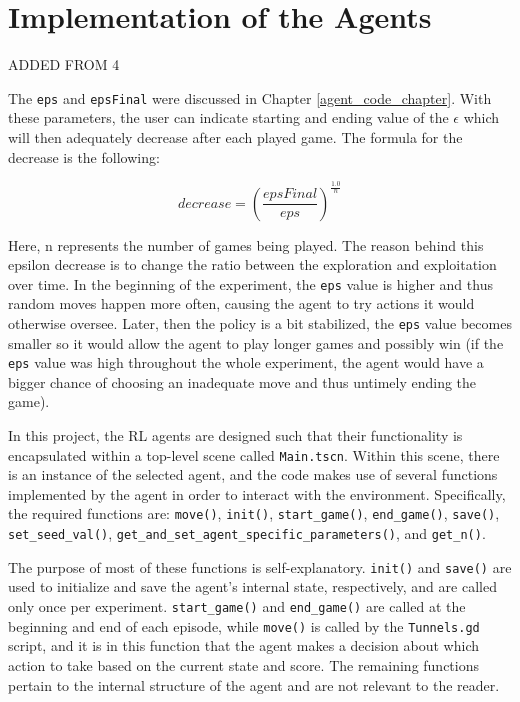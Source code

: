 \chapter{Implementation of the Agents}
ADDED FROM 4

The \texttt{eps} and \texttt{epsFinal} were discussed in Chapter \ref{agent_code_chapter}. With these parameters, the user can indicate starting and ending value of the $\epsilon$ which will then adequately decrease after each played game. The formula for the decrease is the following:

$$decrease = (\frac{epsFinal}{eps})^{\frac{1.0}{n}}$$

Here, n represents the number of games being played. The reason behind this epsilon decrease is to change the ratio between the exploration and exploitation over time. In the beginning of the experiment, the \texttt{eps} value is higher and thus random moves happen more often, causing the agent to try actions it would otherwise oversee. Later, then the policy is a bit stabilized, the \texttt{eps} value becomes smaller so it would allow the agent to play longer games and possibly win (if the \texttt{eps} value was high throughout the whole experiment, the agent would have a bigger chance of choosing an inadequate move and thus untimely ending the game).

\label{implOfAgents}
In this project, the RL agents are designed such that their functionality is encapsulated within a top-level scene called \texttt{Main.tscn}. Within this scene, there is an instance of the selected agent, and the code makes use of several functions implemented by the agent in order to interact with the environment. Specifically, the required functions are: \texttt{move()}, \texttt{init()}, \texttt{start\_game()}, \texttt{end\_game()}, \texttt{save()}, \texttt{set\_seed\_val()}, \texttt{get\_and\_set\_agent\_specific\_parameters()}, and \texttt{get\_n()}.

The purpose of most of these functions is self-explanatory. \texttt{init()} and \texttt{save()} are used to initialize and save the agent's internal state, respectively, and are called only once per experiment. \texttt{start\_game()} and \texttt{end\_game()} are called at the beginning and end of each episode, while \texttt{move()} is called by the \texttt{Tunnels.gd} script, and it is in this function that the agent makes a decision about which action to take based on the current state and score. The remaining functions pertain to the internal structure of the agent and are not relevant to the reader.
